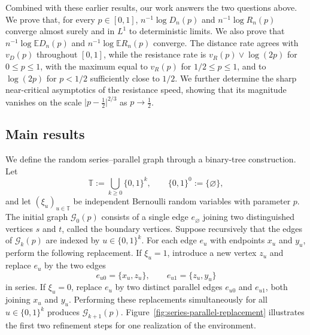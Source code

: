 \documentclass[12pt]{amsart}
\numberwithin{equation}{section}
\theoremstyle{plain}
\theoremstyle{definition}
\newcommand{\E}{\mathbb E}
\begin{document}
Combined with these earlier results, our work answers the two
questions above.  We prove that, for every $p\in[0,1]$,
$n^{-1}\log D_n(p)$ and $n^{-1}\log R_n(p)$ converge almost surely and in
$L^1$ to deterministic limits.  We also prove that
$n^{-1}\log\E D_n(p)$ and $n^{-1}\log\E R_n(p)$ converge.  The distance rate
agrees with $v_D(p)$ throughout $[0,1]$, while the resistance rate is
$v_R(p)\vee\log(2p)$ for $0\le p\le1$, with the maximum equal to $v_R(p)$
for $1/2\le p\le1$, and to $\log(2p)$ for $p<1/2$ sufficiently close to
$1/2$.  We further determine the sharp near-critical asymptotics of the
resistance speed, showing that its magnitude vanishes on the scale
$\lvert p-\frac12\rvert^{2/3}$ as $p\to\frac12$.

\subsection{Main results}
\label{sec:main-results}

We define the random series--parallel graph through a binary-tree
construction.  Let
\[
 \mathbb T:=\bigcup_{k\ge0}\{0,1\}^k,
 \qquad \{0,1\}^0:=\{\varnothing\},
\]
and let $(\xi_u)_{u\in\mathbb T}$ be independent Bernoulli random variables
with parameter $p$.  The initial graph $\mathcal G_0(p)$ consists of a
single edge $e_{\varnothing}$ joining two distinguished vertices $s$ and
$t$, called the boundary vertices.  Suppose recursively that the edges of
$\mathcal G_k(p)$ are indexed by $u\in\{0,1\}^k$.  For each edge $e_u$ with
endpoints $x_u$ and $y_u$, perform the following replacement.  If
$\xi_u=1$, introduce a new vertex $z_u$ and replace $e_u$ by the two edges
\[
 e_{u0}=\{x_u,z_u\},
 \qquad
 e_{u1}=\{z_u,y_u\}
\]
in series.  If $\xi_u=0$, replace $e_u$ by two distinct parallel edges
$e_{u0}$ and $e_{u1}$, both joining $x_u$ and $y_u$.  Performing these
replacements simultaneously for all $u\in\{0,1\}^k$ produces
$\mathcal G_{k+1}(p)$.  Figure~\ref{fig:series-parallel-replacement}
illustrates the first two refinement steps for one realization of the
environment.
\end{document}
